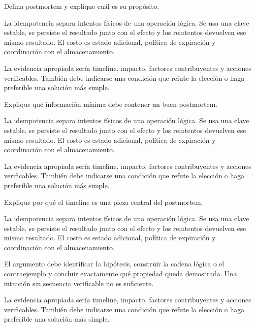\documentclass[variant=guia,cover=institutional,mode=screen]{ua-engineering-v6-article}
\begin{document}
\begin{uaexercise}
Defina postmortem y explique cuál es su propósito.
\end{uaexercise}
\begin{uaanswer}
La idempotencia separa intentos físicos de una operación lógica. Se usa una clave estable, se persiste el resultado junto con el efecto y los reintentos devuelven ese mismo resultado. El costo es estado adicional, política de expiración y coordinación con el almacenamiento.

La evidencia apropiada sería timeline, impacto, factores contribuyentes y acciones verificables. También debe indicarse una condición que refute la elección o haga preferible una solución más simple.
\end{uaanswer}

\begin{uaexercise}
Explique qué información mínima debe contener un buen postmortem.
\end{uaexercise}
\begin{uaanswer}
La idempotencia separa intentos físicos de una operación lógica. Se usa una clave estable, se persiste el resultado junto con el efecto y los reintentos devuelven ese mismo resultado. El costo es estado adicional, política de expiración y coordinación con el almacenamiento.

La evidencia apropiada sería timeline, impacto, factores contribuyentes y acciones verificables. También debe indicarse una condición que refute la elección o haga preferible una solución más simple.
\end{uaanswer}

\begin{uaexercise}
Explique por qué el timeline es una pieza central del postmortem.
\end{uaexercise}
\begin{uaanswer}
La idempotencia separa intentos físicos de una operación lógica. Se usa una clave estable, se persiste el resultado junto con el efecto y los reintentos devuelven ese mismo resultado. El costo es estado adicional, política de expiración y coordinación con el almacenamiento.

El argumento debe identificar la hipótesis, construir la cadena lógica o el contraejemplo y concluir exactamente qué propiedad queda demostrada. Una intuición sin secuencia verificable no es suficiente.

La evidencia apropiada sería timeline, impacto, factores contribuyentes y acciones verificables. También debe indicarse una condición que refute la elección o haga preferible una solución más simple.
\end{uaanswer}
\end{document}
